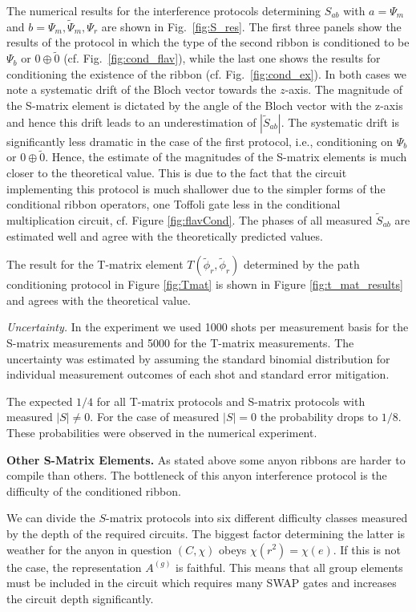\documentclass[two column]{article}
\begin{document}
The numerical results for the interference protocols determining $S_{ab}$ with $a=\Psi_m$ and $b=\Psi_m,\tilde \Psi_m, \Psi_r$ are shown in Fig.~\ref{fig:S_res}. The first three panels show the results of the protocol in which the type of the second ribbon is conditioned to be $\Psi_b$ or $0 \oplus \tilde 0$ (cf. Fig.~\ref{fig:cond_flav}), while the last one shows the results for conditioning the existence of the ribbon (cf. Fig.~\ref{fig:cond_ex}). In both cases we note a systematic drift of the Bloch vector towards the $z$-axis. The magnitude of the S-matrix element is dictated by the angle of the Bloch vector with the z-axis and hence this drift leads to an underestimation of $|\tilde S_{ab}|$. The systematic drift is significantly less dramatic in the case of the first protocol, i.e., conditioning on $\Psi_b$ or $0 \oplus \tilde 0$.  Hence, the estimate of the magnitudes of the S-matrix elements is much closer to the theoretical value. 
 This is due to the fact that the circuit implementing this protocol is much shallower due to the simpler forms of the conditional ribbon operators, one Toffoli gate less in the conditional multiplication circuit, cf. Figure \ref{fig:flavCond}. The phases of all measured $\tilde S_{ab}$ are estimated well and agree with the theoretically predicted values.


The result for the T-matrix element $T(\tilde \phi_r, \tilde \phi_r)$ determined by the path conditioning protocol in Figure \ref{fig:Tmat} is shown in Figure \ref{fig:t_mat_results} and agrees with the theoretical value.



\emph{Uncertainty.} In the experiment we used 1000 shots per measurement basis for the S-matrix measurements and 5000 for the T-matrix measurements. The uncertainty was estimated by assuming the standard binomial distribution for individual measurement outcomes of each shot and standard error mitigation.

The expected $1/4$ for all T-matrix protocols and S-matrix protocols with measured $|S| \neq 0$. For the case of measured $|S| = 0$ the probability drops to $1/8$. These probabilities were observed in the numerical experiment.

\textbf{Other S-Matrix Elements.}
As stated above some anyon ribbons are harder to compile than others. The bottleneck of this anyon interference protocol is the difficulty of the conditioned ribbon. 

We can divide the $S$-matrix protocols into six different difficulty classes measured by the depth of the required circuits. The biggest factor determining the latter is weather for the anyon in question $(C, \chi)$ obeys $\chi(r^2) = \chi(e)$. If this is not the case, the representation $A^{(g)}$ is faithful. This means that all group elements must be included in the circuit which requires many SWAP gates and increases the circuit depth significantly.
\end{document}
